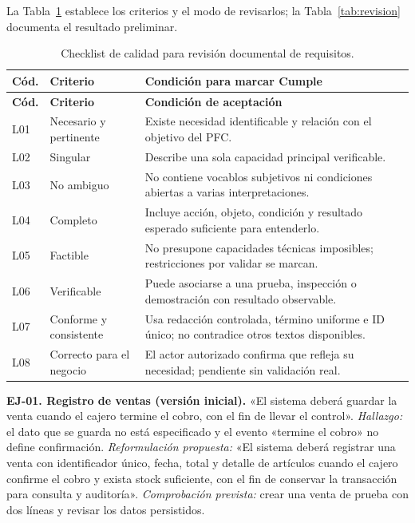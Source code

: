 \documentclass[onecolumn,12pt,a4paper]{IEEEtran}
\begin{document}
La Tabla~\ref{tab:checklist} establece los criterios y el modo de revisarlos; la Tabla~\ref{tab:revision} documenta el resultado preliminar.
\small
\begin{longtable}{@{}p{1.3cm}p{4.5cm}p{9.0cm}@{}}
\caption{Checklist de calidad para revisión documental de requisitos.}\label{tab:checklist}\\
\toprule\textbf{Cód.} & \textbf{Criterio} & \textbf{Condición para marcar Cumple}\\\midrule\endfirsthead
\toprule\textbf{Cód.} & \textbf{Criterio} & \textbf{Condición de aceptación}\\\midrule\endhead
L01 & Necesario y pertinente & Existe necesidad identificable y relación con el objetivo del PFC.\\
L02 & Singular & Describe una sola capacidad principal verificable.\\
L03 & No ambiguo & No contiene vocablos subjetivos ni condiciones abiertas a varias interpretaciones.\\
L04 & Completo & Incluye acción, objeto, condición y resultado esperado suficiente para entenderlo.\\
L05 & Factible & No presupone capacidades técnicas imposibles; restricciones por validar se marcan.\\
L06 & Verificable & Puede asociarse a una prueba, inspección o demostración con resultado observable.\\
L07 & Conforme y consistente & Usa redacción controlada, término uniforme e ID único; no contradice otros textos disponibles.\\
L08 & Correcto para el negocio & El actor autorizado confirma que refleja su necesidad; pendiente sin validación real.\\
\bottomrule\end{longtable}
\normalsize

\textbf{EJ-01. Registro de ventas (versión inicial).} «El sistema deberá guardar la venta cuando el cajero termine el cobro, con el fin de llevar el control». \emph{Hallazgo:} el dato que se guarda no está especificado y el evento «termine el cobro» no define confirmación. \emph{Reformulación propuesta:} «El sistema deberá registrar una venta con identificador único, fecha, total y detalle de artículos cuando el cajero confirme el cobro y exista stock suficiente, con el fin de conservar la transacción para consulta y auditoría». \emph{Comprobación prevista:} crear una venta de prueba con dos líneas y revisar los datos persistidos.
\end{document}
